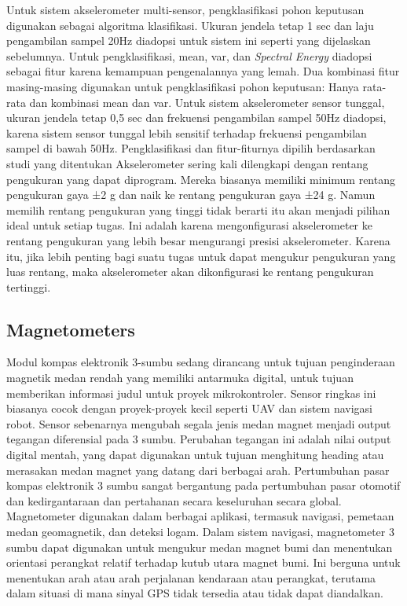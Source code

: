 Untuk sistem akselerometer multi-sensor, pengklasifikasi pohon keputusan digunakan sebagai algoritma klasifikasi. Ukuran jendela tetap 1 sec dan laju pengambilan sampel 20Hz diadopsi untuk sistem ini seperti yang dijelaskan sebelumnya. Untuk pengklasifikasi, mean, var, 
dan \emph{Spectral Energy} diadopsi sebagai fitur karena kemampuan pengenalannya yang lemah. Dua kombinasi fitur masing-masing digunakan untuk pengklasifikasi pohon keputusan: Hanya rata-rata
dan kombinasi mean dan var. Untuk sistem akselerometer sensor tunggal, ukuran jendela tetap 0,5 sec dan frekuensi pengambilan sampel 50Hz diadopsi, karena sistem sensor tunggal lebih 
sensitif terhadap frekuensi pengambilan sampel di bawah 50Hz. Pengklasifikasi dan fitur-fiturnya dipilih berdasarkan studi yang ditentukan Akselerometer sering kali dilengkapi dengan 
rentang pengukuran yang dapat diprogram. Mereka biasanya memiliki minimum rentang pengukuran gaya ±2 g dan naik ke rentang pengukuran gaya ±24 g. Namun memilih rentang pengukuran yang 
tinggi tidak berarti itu akan menjadi pilihan ideal untuk setiap tugas. Ini adalah karena mengonfigurasi akselerometer ke rentang pengukuran yang lebih besar mengurangi presisi 
akselerometer. Karena itu, jika lebih penting bagi suatu tugas untuk dapat mengukur pengukuran yang luas rentang, maka akselerometer akan dikonfigurasi ke rentang pengukuran tertinggi.

\subsection{Magnetometers}

Modul kompas elektronik 3-sumbu sedang dirancang untuk tujuan penginderaan magnetik medan rendah yang memiliki antarmuka digital, untuk tujuan memberikan informasi judul untuk proyek 
mikrokontroler. Sensor ringkas ini biasanya cocok dengan proyek-proyek kecil seperti UAV dan sistem navigasi robot. Sensor sebenarnya mengubah segala jenis medan magnet menjadi output 
tegangan diferensial pada 3 sumbu. Perubahan tegangan ini adalah nilai output digital mentah, yang dapat digunakan untuk tujuan menghitung heading atau merasakan medan magnet yang datang 
dari berbagai arah. Pertumbuhan pasar kompas elektronik 3 sumbu sangat bergantung pada pertumbuhan pasar otomotif dan kedirgantaraan dan pertahanan secara keseluruhan secara global. 
Magnetometer digunakan dalam berbagai aplikasi, termasuk navigasi, pemetaan medan geomagnetik, dan deteksi logam. Dalam sistem navigasi, magnetometer 3 sumbu dapat digunakan untuk 
mengukur medan magnet bumi dan menentukan orientasi perangkat relatif terhadap kutub utara magnet bumi. Ini berguna untuk menentukan arah atau arah perjalanan kendaraan atau perangkat, 
terutama dalam situasi di mana sinyal GPS tidak tersedia atau tidak dapat diandalkan.


